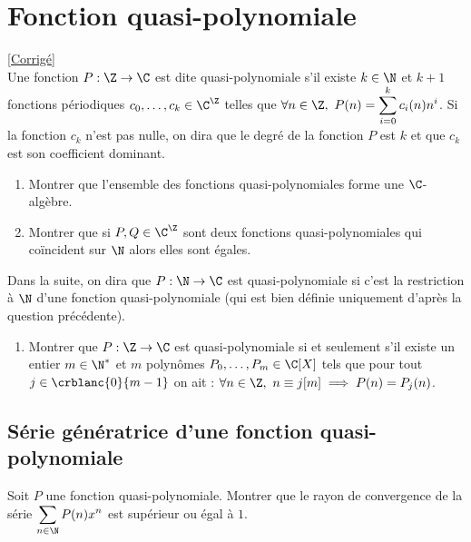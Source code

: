 \documentclass{book}
\begin{document}
\section{Fonction quasi-polynomiale}
\label{FOnction quasi-polynomiale}
\textcolor{blue}{\hyperref[sec:fonction-quasi-polynomiale]{[Corrigé]}}\\
Une fonction $P:\Z\to \C$ est dite quasi-polynomiale s'il existe $k\in \N$ et $k+1$ fonctions périodiques $c_0,\dots,c_k\in \C^\Z$ telles que $\forall n\in \Z,\ P(n)=\displaystyle\sum_{i=0}^kc_i(n)n^i$. Si la fonction $c_k$ n'est pas nulle, on dira que le degré de la fonction $P$ est $k$ et que $c_k$ est son coefficient dominant.
\begin{enumerate}
	\item Montrer que l'ensemble des fonctions quasi-polynomiales forme une $\C$-algèbre.
	\item Montrer que si $P,Q\in \C^\Z$ sont deux fonctions quasi-polynomiales qui coïncident sur $\N$ alors elles sont égales.
\end{enumerate}
Dans la suite, on dira que $P:\N\to \C$ est quasi-polynomiale si c'est la restriction à $\N$ d'une fonction quasi-polynomiale (qui est bien définie uniquement d'après la question précédente). 
\begin{enumerate}[resume]
	\item Montrer que $P:\Z\to\C$ est quasi-polynomiale si et seulement s'il existe un entier $m\in \N^*$ et $m$ polynômes $P_0,\dots,P_m\in \C[X]$ tels que pour tout $j\in \crblanc{0}{m-1}$ on ait : $\forall n\in \Z,\ n\equiv j[m]\implies P(n)=P_j(n)$.
\end{enumerate}

\subsection{Série génératrice d'une fonction quasi-polynomiale}
\label{Série génératrice d'une fonction quasi-polynomiale}
Soit $P$ une fonction quasi-polynomiale. Montrer que le rayon de convergence de la série $\displaystyle\sum_{n\in \N}P(n)x^n$ est supérieur ou égal à $1$.
\end{document}
